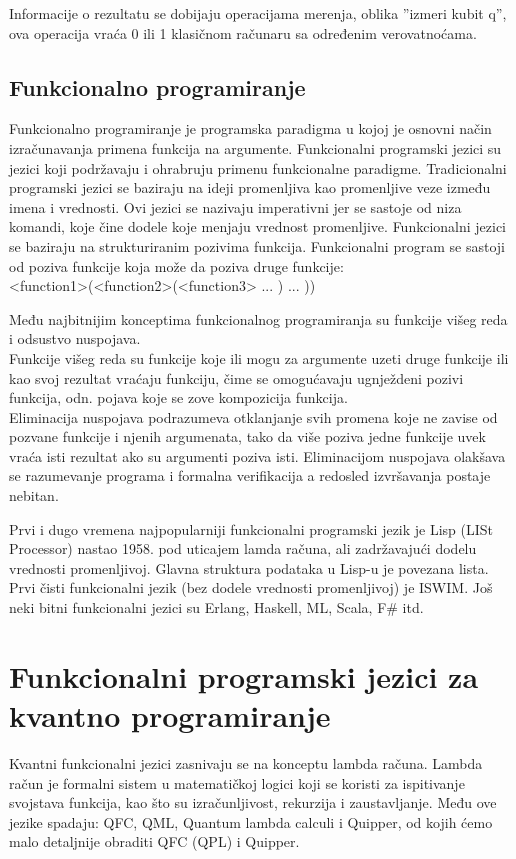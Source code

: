 \documentclass[a4paper]{article}
\begin{document}
{Informacije o rezultatu se dobijaju operacijama merenja, oblika ''izmeri kubit q'', ova operacija vraća 0 ili 1 klasičnom računaru sa određenim verovatnoćama.

\subsection{Funkcionalno programiranje}
\label{sec:funkcionalniprgjezici}

Funkcionalno programiranje je programska paradigma u kojoj je osnovni način izračunavanja primena funkcija na argumente.\cite[p. 3]{funcPro}
Funkcionalni programski jezici su jezici koji podržavaju i ohrabruju primenu funkcionalne paradigme.
Tradicionalni programski jezici se baziraju na ideji promenljiva kao promenljive veze između imena i vrednosti. Ovi jezici se nazivaju 
imperativni jer se sastoje od niza komandi, koje čine dodele koje menjaju vrednost promenljive.
Funkcionalni jezici se baziraju na strukturiranim pozivima funkcija. Funkcionalni program se sastoji od poziva funkcije koja može da
poziva druge funkcije:\\
<function1>(<function2>(<function3> ... ) ... ))\cite[p. 4]{funcPro}

Među najbitnijim konceptima funkcionalnog programiranja su funkcije višeg reda i odsustvo nuspojava. \\
Funkcije višeg reda su funkcije koje ili mogu za argumente uzeti druge funkcije ili kao svoj rezultat vraćaju funkciju, čime se omogućavaju ugnježdeni pozivi funkcija, odn. pojava koje se zove kompozicija funkcija.\\
Eliminacija nuspojava podrazumeva otklanjanje svih promena koje ne zavise od pozvane funkcije i njenih argumenata, tako da više poziva jedne funkcije uvek vraća isti rezultat ako su argumenti poziva isti. Eliminacijom nuspojava olakšava se razumevanje programa i formalna 
verifikacija a redosled izvršavanja postaje nebitan.\par
Prvi i dugo vremena najpopularniji funkcionalni programski jezik je Lisp (LISt Processor) nastao 1958. pod uticajem lamda računa, ali 
zadržavajući dodelu vrednosti promenljivoj. Glavna struktura podataka u Lisp-u je povezana lista. Prvi čisti funkcionalni jezik 
(bez dodele vrednosti promenljivoj) je ISWIM. Još neki bitni funkcionalni jezici su Erlang, Haskell, ML, Scala, F\# itd.

\section{Funkcionalni programski jezici za kvantno programiranje}
\label{sec:funcprl_qp}
Kvantni funkcionalni jezici zasnivaju se na konceptu lambda računa. Lambda račun je formalni sistem u matematičkoj logici koji se koristi za ispitivanje svojstava funkcija, kao što su izračunljivost, rekurzija i zaustavljanje.\cite{survey} Među ove jezike spadaju: QFC, QML, Quantum lambda calculi i Quipper, od kojih ćemo malo detaljnije obraditi QFC (QPL) i Quipper.

}
\end{document}
